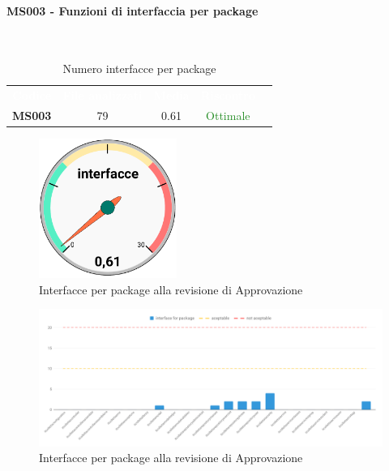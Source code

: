 \paragraph{MS003 - Funzioni di interfaccia per package}\mbox{}\\[0,3cm]
    \begin{table}[H]
        \centering
        \begin{tabular}{ccccc}
            \rowcolor{greySWEight}
            \textcolor{white}{\textbf{Codice}} &
            \textcolor{white}{\textbf{File analizzati}} &
            \textcolor{white}{\textbf{Media}}&
            \textcolor{white}{\textbf{Riscontro}}\\
            \textbf{MS003} & 79 & 0.61 & \textcolor{ForestGreen}{Ottimale}\\
        \end{tabular}
        \caption{Numero interfacce per package}
    \end{table}
    \begin{figure}[H]
        \centering
        \includegraphics[width=45mm]{sez/App_Esito/Approvazione/graph/interfacceCruscotto.pdf}
        \caption{Interfacce per package alla revisione di Approvazione}
    \end{figure}
    \begin{figure}[H]
        \centering
        \includegraphics[width=165mm]{sez/App_Esito/Approvazione/graph/interfacce.pdf}
        \caption{Interfacce per package alla revisione di Approvazione}
    \end{figure}

